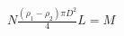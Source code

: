 \documentclass[preview]{standalone}
\begin{document}
\begin{align*}
N \tfrac{(\rho_1-\rho_2)\pi D^2}{4} L = M
\end{align*}
\end{document}
